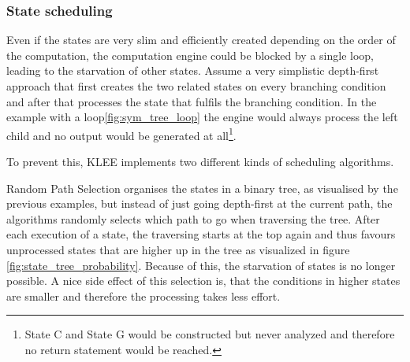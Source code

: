 \subsubsection{State scheduling}\label{section:state_scheduling}
Even if the states are very slim and efficiently created depending on the order of the computation, the computation engine could be blocked by a single loop, leading to the starvation of other states. Assume a very simplistic depth-first approach that first creates the two related states on every branching condition and after that processes the state that fulfils the branching condition. In the example with a loop\ref{fig:sym_tree_loop} the engine would always process the left child and no output would be generated at all\footnote{State C and State G would be constructed but never analyzed and therefore no return statement would be reached.}.

To prevent this, KLEE implements two different kinds of scheduling algorithms. 

Random Path Selection organises the states in a binary tree, as visualised by the previous examples, but instead of just going depth-first at the current path, the algorithms randomly selects which path to go when traversing the tree. After each execution of a state, the traversing starts at the top again and thus favours unprocessed states that are higher up in the tree as visualized in figure \ref{fig:state_tree_probability}. Because of this, the starvation of states is no longer possible. A nice side effect of this selection is, that the conditions in higher states are smaller and therefore the processing takes less effort.

